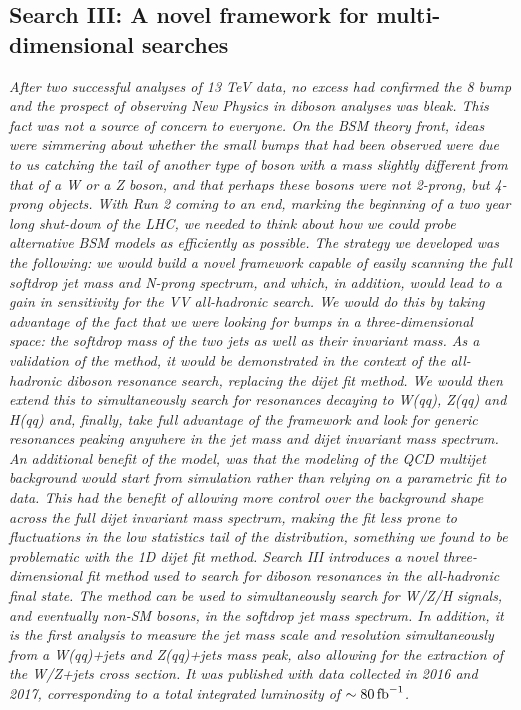 \vspace*{\fill}
\begin{centering}
\chapter{Search III: A novel framework for multi-dimensional searches}
\label{searchIII}
\textit{
\noindent After two successful analyses of 13 TeV data, no excess had confirmed the 8 \TeV bump and the prospect of observing New Physics in diboson analyses was bleak. This fact was not a source of concern to everyone. On the BSM theory front, ideas were simmering about whether the small bumps that had been observed were due to us catching the tail of another type of boson with a mass slightly different from that of a W or a Z boson, and that perhaps these bosons were not 2-prong, but 4-prong objects.
\newline
\newline
With Run 2 coming to an end, marking the beginning of a two year long shut-down of the LHC, we needed to think about how we could probe alternative BSM models as efficiently as possible. The strategy we developed was the following: we would build a novel framework capable of easily scanning the full softdrop jet mass and N-prong spectrum, and which, in addition, would lead to a gain in sensitivity for the VV all-hadronic search. We would do this by taking advantage of the fact that we were looking for bumps in a three-dimensional space: the softdrop mass of the two jets as well as their invariant mass. As a validation of the method, it would be demonstrated in the context of the all-hadronic diboson resonance search, replacing the dijet fit method. We would then extend this to simultaneously search for resonances decaying to W(qq), Z(qq) and H(qq) and, finally, take full advantage of the framework and look for generic resonances peaking anywhere in the jet mass and dijet invariant mass spectrum.
\newline
\newline
An additional benefit of the model, was that the modeling of the QCD multijet background would start from simulation rather than relying on a parametric fit to data. This had the benefit of allowing more control over the background shape across the full dijet invariant mass spectrum, making the fit less prone to fluctuations in the low statistics tail of the distribution, something we found to be problematic with the 1D dijet fit method.
\newline
\newline
Search III introduces a novel three-dimensional fit method used to search for diboson resonances in the all-hadronic final state. The method can be used to simultaneously search for W/Z/H signals, and eventually non-SM bosons, in the softdrop jet mass spectrum. In addition, it is the first analysis to measure the jet mass scale and resolution simultaneously from a W(qq)+jets and Z(qq)+jets mass peak, also allowing for the extraction of the W/Z+jets cross section. It was published with data collected in 2016 and 2017, corresponding to a total integrated luminosity of $\sim 80 \mbox{\ensuremath{\,\text{fb}^\text{$-$1}}}$.}
\end{centering}
 
